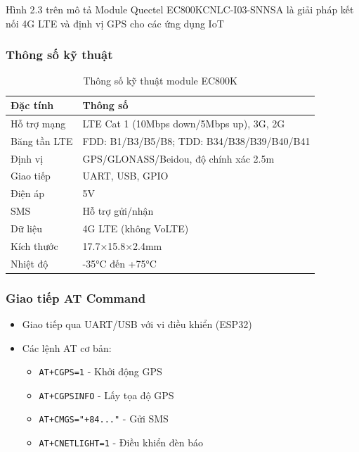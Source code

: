 \documentclass[a4paper,12pt]{report}
\begin{document}
	Hình 2.3 trên mô tả Module Quectel EC800KCNLC-I03-SNNSA là giải pháp kết nối 4G LTE và định vị GPS cho các ứng dụng IoT
	
	\subsubsection{Thông số kỹ thuật}
	\begin{table}[h]
		\centering
		\caption{Thông số kỹ thuật module EC800K}
		\label{tab:ec800k_specs}
		\begin{tabular}{|l|l|}
			\hline
			\textbf{Đặc tính} & \textbf{Thông số} \\ \hline
			Hỗ trợ mạng & LTE Cat 1 (10Mbps down/5Mbps up), 3G, 2G \\ \hline
			Băng tần LTE & FDD: B1/B3/B5/B8; TDD: B34/B38/B39/B40/B41 \\ \hline
			Định vị & GPS/GLONASS/Beidou, độ chính xác 2.5m \\ \hline
			Giao tiếp & UART, USB, GPIO \\ \hline
			Điện áp & 5V \\ \hline
			SMS & Hỗ trợ gửi/nhận \\ \hline
			Dữ liệu & 4G LTE (không VoLTE) \\ \hline
			Kích thước & 17.7×15.8×2.4mm \\ \hline
			Nhiệt độ & -35°C đến +75°C \\ \hline
		\end{tabular}
	\end{table}
	
	\subsubsection{Giao tiếp AT Command}
	\begin{itemize}
		\item Giao tiếp qua UART/USB với vi điều khiển (ESP32)
		\item Các lệnh AT cơ bản:
		\begin{itemize}
			\item \texttt{AT+CGPS=1} - Khởi động GPS
			\item \texttt{AT+CGPSINFO} - Lấy tọa độ GPS
			\item \texttt{AT+CMGS="+84..."} - Gửi SMS
			\item \texttt{AT+CNETLIGHT=1} - Điều khiển đèn báo
		\end{itemize}
	\end{itemize}
	
\end{document}
